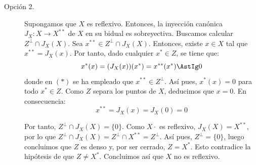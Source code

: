 \begin{ejercicio}
\begin{description}
        \item[Opción 2.] Supongamos que $X$ es reflexivo. Entonces, la inyección canónica $J_X : X \longrightarrow X^{**}$ de $X$ en su bidual es sobreyectiva. Buscamos calcular $Z^\perp\cap J_X(X)$. Sea $x^{**} \in Z^\perp\cap J_X(X)$. Entonces, existe $x \in X$ tal que $x^{**} = J_X(x)$. Por tanto, dado cualquier $x^* \in Z$, se tiene que:
        \begin{equation*}
            x^*(x) = (J_X(x))(x^*) = x^{**}(x^*) \AstIg 0
        \end{equation*}
        donde en $(\ast)$ se ha empleado que $x^{**} \in Z^\perp$. Así pues, $x^*(x) = 0$ para todo $x^* \in Z$. Como $Z$ separa los puntos de $X$, deducimos que $x = 0$. En consecuencia:
        \[
            x^{**} = J_X(x) = J_X(0) = 0
        \]

        Por tanto, $Z^\perp\cap J_X(X) = \{0\}$. Como $X· $ es reflexivo, $J_X(X) = X^{**}$, por lo que $Z^\perp\cap J_X(X) = Z^\perp\cap X^{**} = Z^\perp$. Así pues, $Z^\perp = \{0\}$, luego concluimos que $Z$ es denso y, por ser cerrado, $Z = X^*$. Esto contradice la hipótesis de que $Z \neq X^*$. Concluimos así que $X$ no es reflexivo.
    \end{description}
\end{ejercicio}

